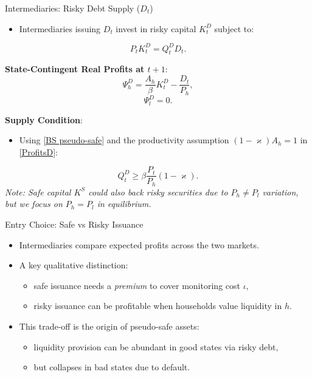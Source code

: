 \documentclass[11pt,aspectratio=169]{beamer}
\begin{document}
\begin{frame}{Intermediaries: Risky Debt Supply ($D_t$)}
\small
\begin{itemize}
    \item Intermediaries issuing $D_{t}$ invest in risky capital $K_{t}^{D}$ subject to:
\end{itemize}

\begin{equation}
P_{t}K_{t}^{D}=Q_{t}^{D}D_{t}. \label{BS pseudo-safe}
\end{equation}

\textbf{State-Contingent Real Profits at $t+1$}:
\begin{equation}
\Psi _{h}^{D}=\frac{A_{h}}{\beta }K_{t}^{D}-\frac{D_{t}}{P_{h}}, \label{ProfitsD}
\end{equation}
\begin{equation}
\Psi _{l}^{D}=0. 
\end{equation}

\textbf{Supply Condition}:
\begin{itemize}
    \item Using \eqref{BS pseudo-safe} and the productivity assumption $(1-\varkappa )A_{h}=1$ in \eqref{ProfitsD}:
\end{itemize}
\begin{equation}
Q_{t}^{D}\geq \beta \frac{P_{t}}{P_{h}}(1-\varkappa ). \label{QD Intermediaries}
\end{equation}
\textit{\small Note: Safe capital $K^S$ could also back risky securities due to $P_h \neq P_l$ variation, but we focus on $P_h = P_l$ in equilibrium.}
\end{frame}

\begin{frame}{Entry Choice: Safe vs Risky Issuance}
\small
\begin{itemize}
  \item Intermediaries compare expected profits across the two markets.
  \vspace{0.4em}
  \item A key qualitative distinction:
  \begin{itemize}
    \item safe issuance needs a \emph{premium} to cover monitoring cost $\iota$,
    \item risky issuance can be profitable when households value liquidity in $h$.
  \end{itemize}
  \vspace{0.4em}
  \item This trade-off is the origin of pseudo-safe assets:
  \begin{itemize}
    \item liquidity provision can be abundant in good states via risky debt,
    \item but collapses in bad states due to default.
  \end{itemize}
\end{itemize}
\end{frame}
\end{document}
